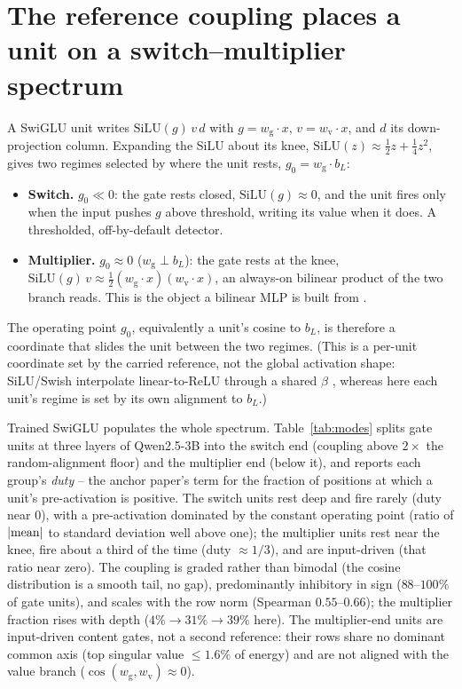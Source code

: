 \documentclass[11pt]{article}
\newcommand{\bl}{b_L}
\newcommand{\wg}{w_{\mathrm{g}}}
\newcommand{\wv}{w_{\mathrm{v}}}
\begin{document}
\section{The reference coupling places a unit on a switch--multiplier spectrum}
\label{sec:spectrum}

A SwiGLU unit writes $\mathrm{SiLU}(g)\,v\,d$ with $g=\wg\!\cdot\! x$,
$v=\wv\!\cdot\! x$, and $d$ its down-projection column. Expanding the SiLU about
its knee, $\mathrm{SiLU}(z)\approx \tfrac12 z + \tfrac14 z^2$, gives two regimes
selected by where the unit rests, $g_0=\wg\!\cdot\!\bl$:
\begin{itemize}
\item \textbf{Switch.} $g_0\ll 0$: the gate rests closed, $\mathrm{SiLU}(g)\approx
  0$, and the unit fires only when the input pushes $g$ above threshold, writing
  its value when it does. A thresholded, off-by-default detector.
\item \textbf{Multiplier.} $g_0\approx 0$ ($\wg \perp \bl$): the gate rests at the
  knee, $\mathrm{SiLU}(g)\,v \approx \tfrac12(\wg\!\cdot\! x)(\wv\!\cdot\! x)$, an
  always-on bilinear product of the two branch reads. This is the object a
  bilinear MLP is built from \citep{pearce2024}.
\end{itemize}
The operating point $g_0$, equivalently a unit's cosine to $\bl$, is therefore a
coordinate that slides the unit between the two regimes. (This is a per-unit
coordinate set by the carried reference, not the global activation shape:
SiLU/Swish interpolate linear-to-ReLU through a shared $\beta$
\citep{ramachandran2017swish}, whereas here each unit's regime is set by its own
alignment to $\bl$.)

Trained SwiGLU populates the whole spectrum. Table~\ref{tab:modes} splits gate
units at three layers of Qwen2.5-3B into the switch end (coupling above
$2\times$ the random-alignment floor) and the multiplier end (below it), and
reports each group's \emph{duty} -- the anchor paper's term for the fraction of
positions at which a unit's pre-activation is positive. The switch units rest
deep and fire rarely (duty near $0$), with a pre-activation dominated by the
constant operating point (ratio of $|{\rm mean}|$ to standard deviation well above
one); the multiplier units rest near the knee, fire about a third of the time
(duty $\approx 1/3$), and are input-driven (that ratio near zero). The coupling is graded rather than
bimodal (the cosine distribution is a smooth tail, no gap), predominantly
inhibitory in sign ($88$--$100\%$ of gate units), and scales with the row norm
(Spearman $0.55$--$0.66$); the multiplier fraction rises with depth ($4\%\to
31\%\to 39\%$ here). The multiplier-end units are input-driven content gates, not
a second reference: their rows share no dominant common axis (top singular value
$\leq 1.6\%$ of energy) and are not aligned with the value branch
($\cos(\wg,\wv)\approx 0$).
\end{document}
